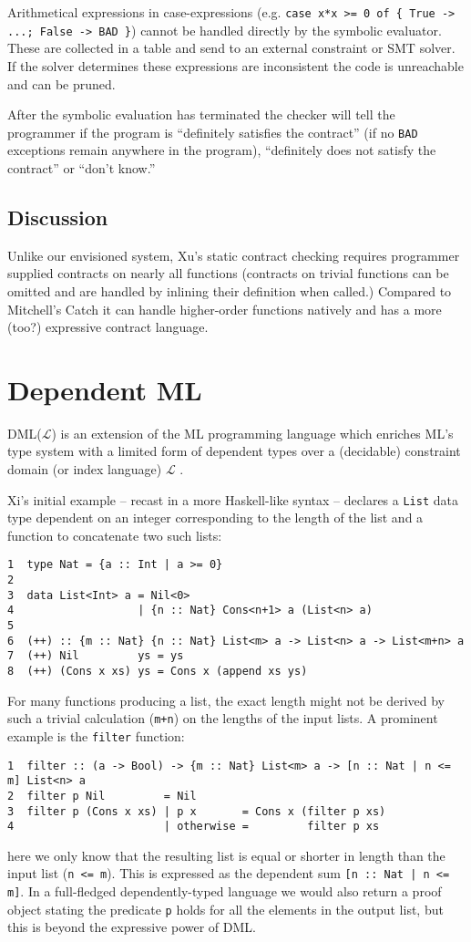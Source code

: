 \documentclass[a4paper]{report}
\begin{document}
Arithmetical expressions in case-expressions (e.g. \texttt{case x*x >= 0 of \{ True -> ...; False -> BAD \}}) cannot be handled directly by the symbolic evaluator. These are collected in a table and send to an external constraint or SMT solver. If the solver determines these expressions are inconsistent the code is unreachable and can be pruned.

After the symbolic evaluation has terminated the checker will tell the programmer if the program is ``definitely satisfies the contract'' (if no \texttt{BAD} exceptions remain anywhere in the program), ``definitely does not satisfy the contract'' or ``don't know.''

\subsection{Discussion}
Unlike our envisioned system, Xu's static contract checking requires programmer supplied contracts on nearly all functions (contracts on trivial functions can be omitted and are handled by inlining their definition when called.) Compared to Mitchell's Catch it can handle higher-order functions natively and has a more (too?) expressive contract language.

\section{Dependent ML}
DML($\mathcal{L}$) is an extension of the ML programming language which enriches ML's type system with a limited form of dependent types over a (decidable) constraint domain (or index language) $\mathcal{L}$ \cite{DML-JFP07}.

Xi's initial example -- recast in a more Haskell-like syntax -- declares a {\tt List} data type dependent on an integer corresponding to the length of the list and a function to concatenate two such lists:
\begin{verbatim}
1  type Nat = {a :: Int | a >= 0}
2
3  data List<Int> a = Nil<0>
4                   | {n :: Nat} Cons<n+1> a (List<n> a)
5
6  (++) :: {m :: Nat} {n :: Nat} List<m> a -> List<n> a -> List<m+n> a
7  (++) Nil         ys = ys
8  (++) (Cons x xs) ys = Cons x (append xs ys)
\end{verbatim}


For many functions producing a list, the exact length might not be derived by such a trivial calculation ({\tt m+n}) on the lengths of the input lists. A prominent example is the {\tt filter} function:
\begin{verbatim}
1  filter :: (a -> Bool) -> {m :: Nat} List<m> a -> [n :: Nat | n <= m] List<n> a
2  filter p Nil         = Nil
3  filter p (Cons x xs) | p x       = Cons x (filter p xs)
4                       | otherwise =         filter p xs
\end{verbatim}
here we only know that the resulting list is equal or shorter in length than the input list ({\tt n <= m}). This is expressed as the dependent sum {\tt [n :: Nat | n <= m]}. In a full-fledged dependently-typed language we would also return a proof object stating the predicate {\tt p} holds for all the elements in the output list, but this is beyond the expressive power of DML.
\end{document}
